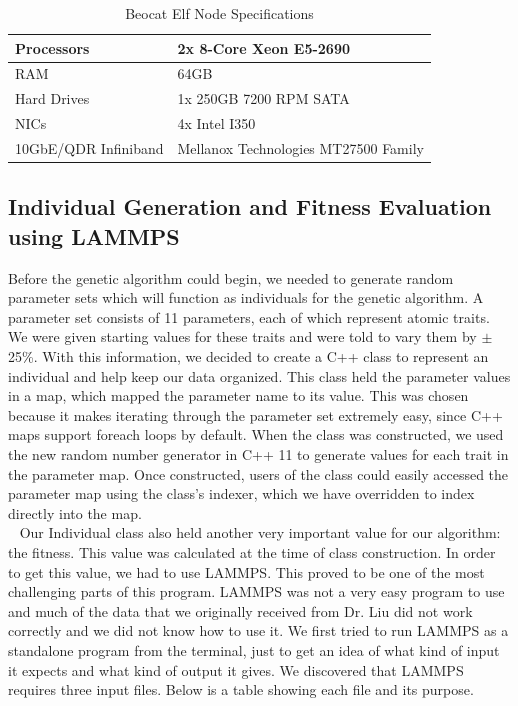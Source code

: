 \documentclass[letterpaper, 12pt]{article}
\begin{document}
\begin{flushleft}
\begin{table}[ht]
	\centering
	\caption{Beocat Elf Node Specifications}
	\label{nodespecs}
	\begin{tabular}{|l|l|}
		\hline
		Processors           & 2x 8-Core Xeon E5-2690               \\ \hline
		RAM                  & 64GB                                 \\ \hline
		Hard Drives          & 1x 250GB 7200 RPM SATA               \\ \hline
		NICs                 & 4x Intel I350                        \\ \hline
		10GbE/QDR Infiniband & Mellanox Technologies MT27500 Family \\ \hline
	\end{tabular}
\end{table}

\subsection*{Individual Generation and Fitness Evaluation using LAMMPS}

Before the genetic algorithm could begin, we needed to generate random parameter sets which will function as individuals for the genetic algorithm. 
A parameter set consists of 11 parameters, each of which represent atomic traits. We were given starting values for these traits and were told to vary them by $\pm$ 25\%. 
With this information, we decided to create a C++ class to represent an individual and help keep our data organized. This class held the parameter values in a map, which mapped the parameter name to its value. 
This was chosen because it makes iterating through the parameter set extremely easy, since C++ maps support foreach loops by default. When the class was constructed, we used the new
random number generator in C++ 11 to generate values for each trait in the parameter map. Once constructed, users of the class could easily accessed the parameter map using the class's 
indexer, which we have overridden to index directly into the map. \\
~\newline
Our Individual class also held another very important value for our algorithm: the fitness. This value was calculated at the time of class construction. In order to get this value,
we had to use LAMMPS. This proved to be one of the most challenging parts of this program. LAMMPS was not a very easy program to use and much of the data that we originally received
from Dr. Liu did not work correctly and we did not know how to use it. We first tried to run LAMMPS as a standalone program from the terminal, just to get an idea of what kind of
input it expects and what kind of output it gives. We discovered that LAMMPS requires three input files. Below is a table showing each file and its purpose.


\end{flushleft}
\end{document}
